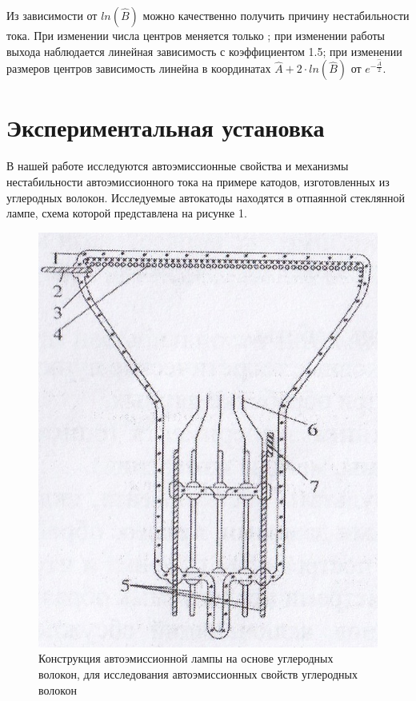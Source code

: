 \documentclass[a4paper,12pt]{article}
\theoremstyle{plain} %
\theoremstyle{definition} %
\theoremstyle{remark} %
\begin{document}
Из зависимости  от $ln(\hat{B})$ можно качественно получить причину нестабильности тока. При изменении числа центров меняется только ; при изменении работы выхода наблюдается линейная зависимость с коэффициентом 1.5; при изменении размеров центров зависимость линейна в координатах $\hat{A} + 2\cdot ln(\hat{B})$  от $e^{-\frac{\hat{A}}{2}}$.

\section{Экспериментальная установка}
В нашей работе исследуются автоэмиссионные свойства и механизмы нестабильности автоэмиссионного тока на примере катодов, изготовленных из углеродных волокон. Исследуемые автокатоды находятся в отпаянной стеклянной лампе, схема которой представлена на рисунке 1.

\begin{figure}[H]
	\centering
	\includegraphics[scale=0.4]{pic1.jpg}
	\caption{Конструкция автоэмиссионной лампы на основе углеродных волокон, для исследования автоэмиссионных свойств углеродных волокон}
	\label{pic2}
\end{figure}
\end{document}
